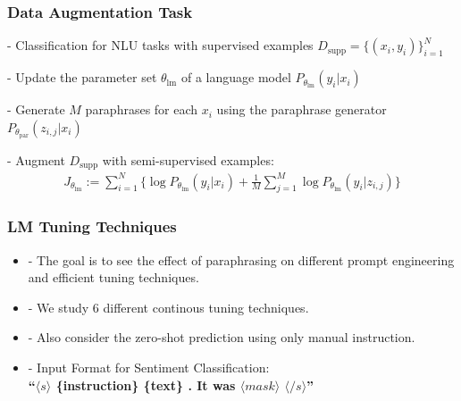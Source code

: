 \documentclass{beamer}
\begin{document}
\begin{frame}
\frametitle{Data Augmentation Task}
 - Classification for NLU tasks with supervised examples $D_{\text{supp}} = \{(x_i, y_i)\}_{i=1}^{N}$

 \medskip
 \medskip
 \medskip

 - Update the parameter set $\theta_{\text{lm}}$ of a language model $P_{\theta_{\text{lm}}} (y_i | x_i)$

 \medskip
 \medskip
 \medskip

 - Generate $M$ paraphrases for each $x_i$ using the paraphrase generator $P_{\theta_{\text{par}}} (z_{i,j} | x_i)$

 \medskip
 \medskip
 \medskip

 - Augment $D_{\text{supp}}$ with semi-supervised examples:
\begin{multline}
J_{\theta_{\text{lm}}} := \sum_{i=1}^{N} \{\log P_{\theta_{\text{lm}}} (y_i | x_i) + \frac{1}{M} \sum_{j=1}^{M} \log P_{\theta_{\text{lm}}} (y_i | z_{i,j})\}
\label{lmfp-augmentation-objective}
\end{multline}

\end{frame}


\begin{frame}
\frametitle{LM Tuning Techniques}

\begin{itemize}
    \item - The goal is to see the effect of paraphrasing on different prompt engineering and efficient tuning techniques.

    \medskip
    \medskip
    \medskip

    \item - We study 6 different continous tuning techniques.

    \medskip
    \medskip
    \medskip

    \item - Also consider the zero-shot prediction using only manual instruction.

    \medskip
    \medskip
    \medskip

    \item - Input Format for Sentiment Classification:\\
    \textbf{``$\langle s \rangle$ \{instruction\} \{text\} . It was $\langle mask \rangle$ $\langle /s \rangle$''}\\
\end{itemize}

\end{frame}
\end{document}
